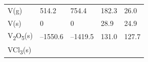 \documentclass[
  9pt,
]{extbook}
\theoremstyle{definition}
\theoremstyle{definition}
\theoremstyle{definition}
\theoremstyle{remark}
\begin{document}
\begin{longtable}[]{@{}lllll@{}}
\begin{minipage}[t]{0.10\columnwidth}
V(g)\strut
\end{minipage} & \begin{minipage}[t]{0.19\columnwidth}\raggedright
514.2\strut
\end{minipage} & \begin{minipage}[t]{0.20\columnwidth}\raggedright
754.4\strut
\end{minipage} & \begin{minipage}[t]{0.18\columnwidth}\raggedright
182.3\strut
\end{minipage} & \begin{minipage}[t]{0.18\columnwidth}\raggedright
26.0\strut
\end{minipage}\tabularnewline
\begin{minipage}[t]{0.10\columnwidth}\raggedright
V(s)\strut
\end{minipage} & \begin{minipage}[t]{0.19\columnwidth}\raggedright
0\strut
\end{minipage} & \begin{minipage}[t]{0.20\columnwidth}\raggedright
0\strut
\end{minipage} & \begin{minipage}[t]{0.18\columnwidth}\raggedright
28.9\strut
\end{minipage} & \begin{minipage}[t]{0.18\columnwidth}\raggedright
24.9\strut
\end{minipage}\tabularnewline
\begin{minipage}[t]{0.10\columnwidth}\raggedright
V\textsubscript{2}O\textsubscript{5}(s)\strut
\end{minipage} & \begin{minipage}[t]{0.19\columnwidth}\raggedright
--1550.6\strut
\end{minipage} & \begin{minipage}[t]{0.20\columnwidth}\raggedright
--1419.5\strut
\end{minipage} & \begin{minipage}[t]{0.18\columnwidth}\raggedright
131.0\strut
\end{minipage} & \begin{minipage}[t]{0.18\columnwidth}\raggedright
127.7\strut
\end{minipage}\tabularnewline
\begin{minipage}[t]{0.10\columnwidth}\raggedright
VCl\textsubscript{3}(s)\strut
\end{minipage} & \begin{minipage}[t]{0.19\columnwidth}\raggedright

\end{minipage}
\end{longtable}
\end{document}
